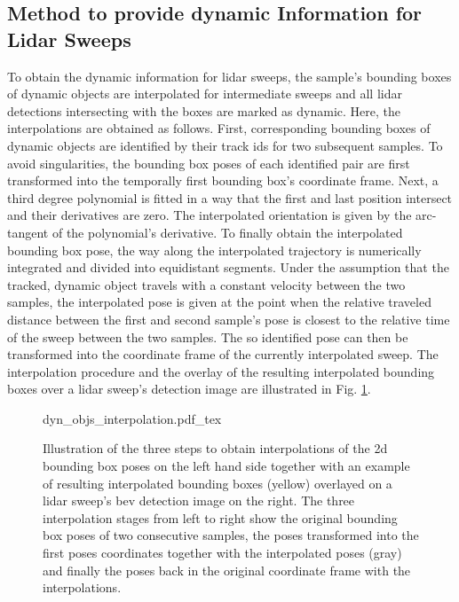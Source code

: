 \subsection{Method to provide dynamic Information for Lidar Sweeps}
\label{subsec:method_dyn_info_for_lidar}
To obtain the dynamic information for lidar sweeps, the sample's bounding boxes of dynamic objects are interpolated for intermediate sweeps and all lidar detections intersecting with the boxes are marked as dynamic. Here, the interpolations are obtained as follows. First, corresponding bounding boxes of dynamic objects are identified by their track ids for two subsequent samples. To avoid singularities, the bounding box poses of each identified pair are first transformed into the temporally first bounding box's coordinate frame. Next, a third degree polynomial is fitted in a way that the first and last position intersect and their derivatives are zero. The interpolated orientation is given by the arc-tangent of the polynomial's derivative. To finally obtain the interpolated bounding box pose, the way along the interpolated trajectory is numerically integrated and divided into equidistant segments. Under the assumption that the tracked, dynamic object travels with a constant velocity between the two samples, the interpolated pose is given at the point when the relative traveled distance between the first and second sample's pose is closest to the relative time of the sweep between the two samples. The so identified pose can then be transformed into the coordinate frame of the currently interpolated sweep. The interpolation procedure and the overlay of the resulting interpolated bounding boxes over a lidar sweep's detection image are illustrated in Fig. \ref{fig:dyn_objs_interpolation}. 
\begin{figure}
	\begin{center}
		{dyn_objs_interpolation.pdf_tex}
		\caption{\label{fig:dyn_objs_interpolation}Illustration of the three steps to obtain interpolations of the 2d bounding box poses on the left hand side together with an example of resulting interpolated bounding boxes (yellow) overlayed on a lidar sweep's \gls{bev} detection image on the right. The three interpolation stages from left to right show the original bounding box poses of two consecutive samples, the poses transformed into the first poses coordinates together with the interpolated poses (gray) and finally the poses back in the original coordinate frame with the interpolations.}
	\end{center}
\end{figure} 
%
